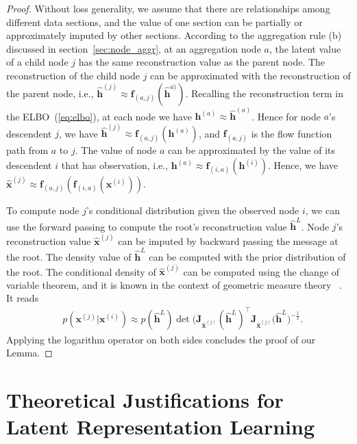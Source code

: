 \documentclass{article}
\begin{document}
\begin{proof}
Without loss generality, we assume that there are relationships among different data sections, and the value of one section can be partially or approximately imputed by other sections. 
According to the aggregation rule (b) discussed in section~\ref{sec:node_aggr}, at an aggregation node  $a$, the latent value of a child node $j$ has the same reconstruction value as the parent node.  
The reconstruction of the child node $j$ can be approximated with the reconstruction of the parent node, i.e., $\widehat{\mathbf{h}}^{(j)} \approx \mathbf{f}_{(a,j)}(\widehat{\mathbf{h}}^{a)})$. 
Recalling the reconstruction term in the ELBO~(\ref{eq:elbo}), at each node we have $\mathbf{h}^{(a)} \approx \widehat{\mathbf{h}}^{(a)}$. Hence for node $a$'s descendent $j$, we have $\widehat{\mathbf{h}}^{(j)} \approx \mathbf{f}_{(a,j)}(\mathbf{h}^{(a)})$, and $\mathbf{f}_{(a,j)}$ is the flow function path from $a$ to $j$. 
The value of node $a$ can be approximated by the value of its descendent $i$ that has observation, i.e., $\mathbf{h}^{(a)} \approx \mathbf{f}_{(i,a)}(\mathbf{h}^{(i)})$. Hence, we have $\widehat{\mathbf{x}}^{(j)} \approx  \mathbf{f}_{(a,j)}(\mathbf{f}_{(i, a)}(\mathbf{x}^{(i)}))$.

To compute  node $j$'s conditional distribution given the observed node $i$, we can use the forward passing to compute the root's reconstruction  value $\widehat{\mathbf{h}}^L$. 
Node $j$'s reconstruction value $\widehat{\mathbf{x}}^{(j)}$ can be imputed by backward passing the message at the root. The density value of $\widehat{\mathbf{h}}^L$ can be computed with the prior distribution of the root. The conditional density of $\widehat{\mathbf{x}}^{(j)}$ can be computed using the change of variable theorem, and it is known in the context of geometric measure theory ~\cite{Book:Hanson_1994,Article:Krantz_2008}. It reads 
\begin{align*} %
&  p(\mathbf{x}^{(j)} | \mathbf{x}^{(i)} ) \approx p(\widehat{\mathbf{h}}^L)\det\big(\mathbf{J}_{\widehat{\mathbf{x}}^{(j)}}(\widehat{\mathbf{h}}^L)^\top  \mathbf{J}_{\widehat{\mathbf{x}}^{(j)}}(\widehat{\mathbf{h}}^L\big)^{-\frac{1}{2}}.
\end{align*}
Applying the logarithm operator on both sides concludes the proof of our Lemma.
\end{proof}





\section{Theoretical Justifications for Latent Representation Learning}\label{sec:theory}
\end{document}
